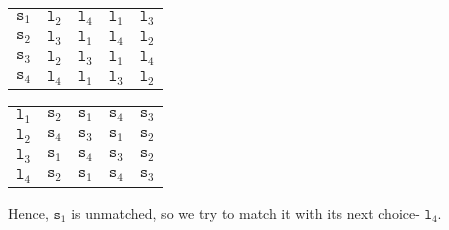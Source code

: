 \documentclass[a4paper, openany]{memoir}
\begin{document}
    \begin{table}[H]
        \centering
        \begin{subtable}{0.45\textwidth}
            \centering
            \begin{tabular}{c|cccc}
                $\texttt{s}_1$ & {\color{gray} $\texttt{l}_2$} & $\texttt{l}_4$ & $\texttt{l}_1$ & $\texttt{l}_3$ \\
                $\texttt{s}_2$ & \underline{$\texttt{l}_3$} & $\texttt{l}_1$ & $\texttt{l}_4$ & $\texttt{l}_2$ \\
                $\texttt{s}_3$ & \underline{$\texttt{l}_2$} & $\texttt{l}_3$ & $\texttt{l}_1$ & $\texttt{l}_4$ \\
                $\texttt{s}_4$ & $\texttt{l}_4$ & $\texttt{l}_1$ & $\texttt{l}_3$ & $\texttt{l}_2$
            \end{tabular}
        \end{subtable}
        \hfill
        \begin{subtable}{0.45\textwidth}
            \centering
            \begin{tabular}{c|cccc}
                $\texttt{l}_1$ & $\texttt{s}_2$ & $\texttt{s}_1$ & $\texttt{s}_4$ & $\texttt{s}_3$ \\
                $\texttt{l}_2$ & $\texttt{s}_4$ & \underline{$\texttt{s}_3$} & $\texttt{s}_1$ & $\texttt{s}_2$ \\
                $\texttt{l}_3$ & $\texttt{s}_1$ & $\texttt{s}_4$ & $\texttt{s}_3$ & \underline{$\texttt{s}_2$} \\
                $\texttt{l}_4$ & $\texttt{s}_2$ & $\texttt{s}_1$ & $\texttt{s}_4$ & $\texttt{s}_3$
            \end{tabular}
        \end{subtable}
    \end{table}
    \noindent Hence, $\texttt{s}_1$ is unmatched, so we try to match it with its next choice- $\texttt{l}_4$.
\end{document}
